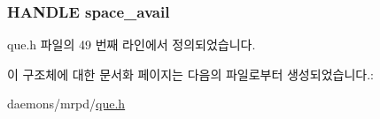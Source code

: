 \subsubsection[{\texorpdfstring{space\+\_\+avail}{space_avail}}]{\setlength{\rightskip}{0pt plus 5cm}H\+A\+N\+D\+LE space\+\_\+avail}\hypertarget{structque__def_a71bec5ae45e00f19c6d6925c9fa4a1be}{}\label{structque__def_a71bec5ae45e00f19c6d6925c9fa4a1be}


que.\+h 파일의 49 번째 라인에서 정의되었습니다.



이 구조체에 대한 문서화 페이지는 다음의 파일로부터 생성되었습니다.\+:\begin{DoxyCompactItemize}
\item 
daemons/mrpd/\hyperlink{que_8h}{que.\+h}\end{DoxyCompactItemize}
